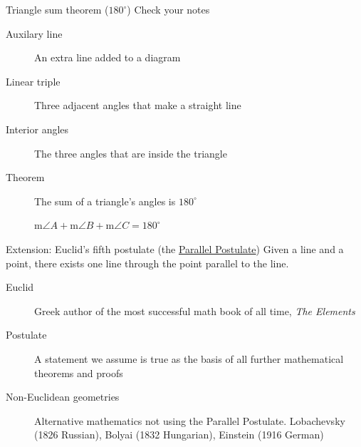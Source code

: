 \documentclass[onlytextwidth, aspectratio=169]{beamer}
\newcommand\paraticks{}
\def\paraticks{{Straight Barb[reversed, scale=2]}-{Straight Barb[scale=2]}}
\begin{document}
\begin{frame}{Triangle sum theorem ($180^\circ$)}
  {Check your notes}
     \smallskip
  \begin{description}
    \item[Auxilary line] An extra line added to a diagram
    \item[Linear triple] Three adjacent angles that make a straight line
    \item[Interior angles] The three angles that are inside the triangle
    \item[Theorem] The sum of a triangle's angles is $180^\circ$ \par \smallskip
    m$\angle A + \text{m}\angle B + \text{m}\angle C = 180^\circ$
  \end{description}
  \end{frame}

\begin{frame}{Extension: Euclid's fifth postulate (the \href{https://mathworld.wolfram.com/ParallelPostulate.html}{Parallel Postulate})}
  {Given a line and a point, there exists one line through the point parallel to the line.}
     \smallskip
  \begin{description}
    \item[Euclid] Greek author of the most successful math book of all time, \emph{The Elements}
    \item[Postulate] A statement we assume is true as the basis of all further mathematical theorems and proofs
    \item[Non-Euclidean geometries] Alternative mathematics not using the Parallel Postulate. Lobachevsky (1826 Russian), Bolyai (1832 Hungarian), Einstein (1916 German)
  \end{description}
  \end{frame}
\end{document}
